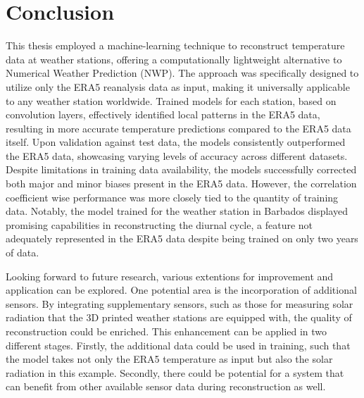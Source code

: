 \section{Conclusion}
\label{sec: conclusion}

This thesis employed a machine-learning technique to reconstruct temperature data at weather stations, offering a computationally lightweight alternative to Numerical Weather Prediction (NWP).
The approach was specifically designed to utilize only the ERA5 reanalysis data as input, making it universally applicable to any weather station worldwide.
Trained models for each station, based on convolution layers, effectively identified local patterns in the ERA5 data, resulting in more accurate temperature predictions compared to the ERA5 data itself.
Upon validation against test data, the models consistently outperformed the ERA5 data, showcasing varying levels of accuracy across different datasets.
Despite limitations in training data availability, the models successfully corrected both major and minor biases present in the ERA5 data. However, the correlation coefficient wise performance was more closely tied to the quantity of training data.
Notably, the model trained for the weather station in Barbados displayed promising capabilities in reconstructing the diurnal cycle, a feature not adequately represented in the ERA5 data despite being trained on only two years of data.

Looking forward to future research, various extentions for improvement and application can be explored.
One potential area is the incorporation of additional sensors.
By integrating supplementary sensors, such as those for measuring solar radiation that the 3D printed weather stations are equipped with, the quality of reconstruction could be enriched.
This enhancement can be applied in two different stages.
Firstly, the additional data could be used in training, such that the model takes not only the ERA5 temperature as input but also the solar radiation in this example.
Secondly, there could be potential for a system that can benefit from other available sensor data during reconstruction as well. 

